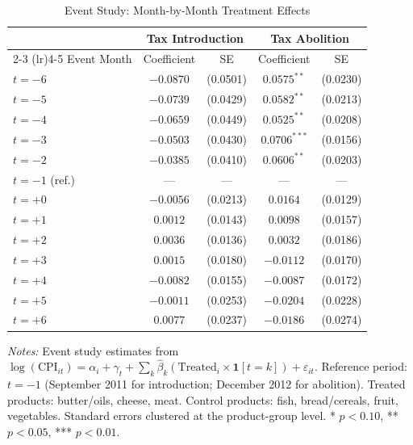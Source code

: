 \begin{table}[H]
\centering
\caption{Event Study: Month-by-Month Treatment Effects}
\label{tab:eventstudy}
\begin{threeparttable}
\begin{tabular}{lcccc}
\toprule
 & \multicolumn{2}{c}{Tax Introduction} & \multicolumn{2}{c}{Tax Abolition} \\
\cmidrule(lr){2-3} \cmidrule(lr){4-5}
Event Month & Coefficient & SE & Coefficient & SE \\
\midrule
$t = -6$ & $-0.0870$ & (0.0501) & $0.0575^{**}$ & (0.0230) \\
$t = -5$ & $-0.0739$ & (0.0429) & $0.0582^{**}$ & (0.0213) \\
$t = -4$ & $-0.0659$ & (0.0449) & $0.0525^{**}$ & (0.0208) \\
$t = -3$ & $-0.0503$ & (0.0430) & $0.0706^{***}$ & (0.0156) \\
$t = -2$ & $-0.0385$ & (0.0410) & $0.0606^{**}$ & (0.0203) \\
$t = -1$ (ref.) & --- & --- & --- & --- \\
$t = +0$ & $-0.0056$ & (0.0213) & $0.0164$ & (0.0129) \\
$t = +1$ & $0.0012$ & (0.0143) & $0.0098$ & (0.0157) \\
$t = +2$ & $0.0036$ & (0.0136) & $0.0032$ & (0.0186) \\
$t = +3$ & $0.0015$ & (0.0180) & $-0.0112$ & (0.0170) \\
$t = +4$ & $-0.0082$ & (0.0155) & $-0.0087$ & (0.0172) \\
$t = +5$ & $-0.0011$ & (0.0253) & $-0.0204$ & (0.0228) \\
$t = +6$ & $0.0077$ & (0.0237) & $-0.0186$ & (0.0274) \\
\bottomrule
\end{tabular}
\begin{tablenotes}[flushleft]
\small
\item \textit{Notes:} Event study estimates from $\log(\text{CPI}_{it}) = \alpha_i + \gamma_t + \sum_k \hat{\beta}_k (\text{Treated}_i \times \mathbf{1}[t = k]) + \varepsilon_{it}$. Reference period: $t=-1$ (September 2011 for introduction; December 2012 for abolition). Treated products: butter/oils, cheese, meat. Control products: fish, bread/cereals, fruit, vegetables. Standard errors clustered at the product-group level. * $p<0.10$, ** $p<0.05$, *** $p<0.01$.
\end{tablenotes}
\end{threeparttable}
\end{table}


